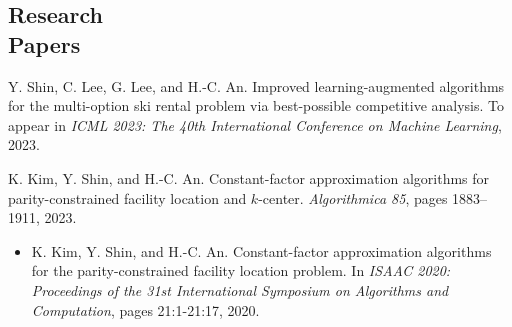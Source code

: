 \documentclass[margin, 10pt]{res} %
\begin{document}
\begin{resume}

\section{Research \\ Papers}
Y. Shin, C. Lee, G. Lee, and H.-C. An. Improved learning-augmented algorithms for the multi-option ski rental problem via best-possible competitive analysis. To appear in \emph{ICML 2023: The 40th International Conference on Machine Learning}, 2023.

K. Kim, Y. Shin, and H.-C. An. Constant-factor approximation algorithms for parity-constrained facility location and $k$-center. \emph{Algorithmica 85}, pages 1883–1911, 2023.
\begin{itemize} %
\item[] K. Kim, Y. Shin, and H.-C. An. Constant-factor approximation algorithms for the parity-constrained facility location problem. In \emph{ISAAC 2020: Proceedings of the 31st International Symposium on Algorithms and Computation}, pages 21:1-21:17, 2020.
\end{itemize}


\end{resume}
\end{document}

